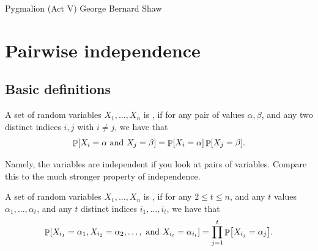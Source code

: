 \makeatletter
{}
\makeatother
\ifx\bookMode\undefined%
\fi
{}



\ChapterPrefix{}
\ChapterGen{}

%
{Pygmalion (Act V)}%
{George Bernard Shaw}


\section{Pairwise independence}

\subsection{Basic definitions}

\begin{defn}
    A set of random variables $X_1, \ldots, X_n$ is , if for any pair of
    values $\alpha, \beta$, and any two distinct indices $i,j$ with
    $i \neq j$, we have that
    \begin{equation*}
        \Prob{X_i =\alpha \text{ and } X_j = \beta}%
        =%
        \Prob{X_i =\alpha} \Prob{ X_j = \beta}.
    \end{equation*}
\end{defn}

Namely, the variables are independent if you look at pairs of
variables. Compare this to the much stronger property of independence.
\begin{defn}
    A set of random variables $X_1, \ldots, X_n$ is
    , if for any
    $2 \leq t \leq n$, and any $t$ values $\alpha_1, \ldots, \alpha_t$, and any
    $t$ distinct indices $i_1,\ldots, i_t$, we have that
    \begin{equation*}
        \Prob{X_{i_1} =\alpha_1, X_{i_2} =\alpha_2,\ldots,
           \text{ and } X_{i_t} = \alpha_{i_t}}%
        =%
        \prod_{j=1}^t
        \Prob{X_{i_j} =\alpha_j}.
    \end{equation*}
\end{defn}


